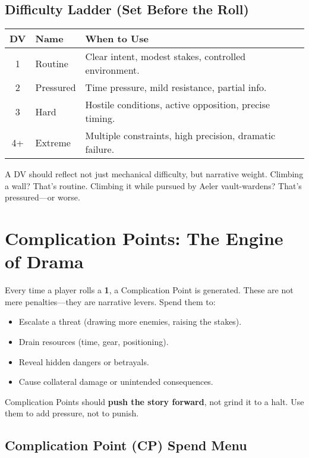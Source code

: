 \subsection*{Difficulty Ladder (Set Before the Roll)}

\begin{center}
\begin{tabular}{cll}
\toprule
\textbf{DV} & \textbf{Name} & \textbf{When to Use} \\
\midrule
1 & Routine & Clear intent, modest stakes, controlled environment. \\
2 & Pressured & Time pressure, mild resistance, partial info. \\
3 & Hard & Hostile conditions, active opposition, precise timing. \\
4+ & Extreme & Multiple constraints, high precision, dramatic failure. \\
\bottomrule
\end{tabular}
\end{center}

A DV should reflect not just mechanical difficulty, but narrative weight. Climbing a wall? That's routine. Climbing it while pursued by Aeler vault-wardens? That's pressured—or worse.

\section*{Complication Points: The Engine of Drama}

Every time a player rolls a \textbf{1}, a Complication Point is generated. These are not mere penalties—they are narrative levers. Spend them to:

\begin{itemize}
    \item Escalate a threat (drawing more enemies, raising the stakes).
    \item Drain resources (time, gear, positioning).
    \item Reveal hidden dangers or betrayals.
    \item Cause collateral damage or unintended consequences.
\end{itemize}

Complication Points should \textbf{push the story forward}, not grind it to a halt. Use them to add pressure, not to punish.

\subsection*{Complication Point (CP) Spend Menu}

